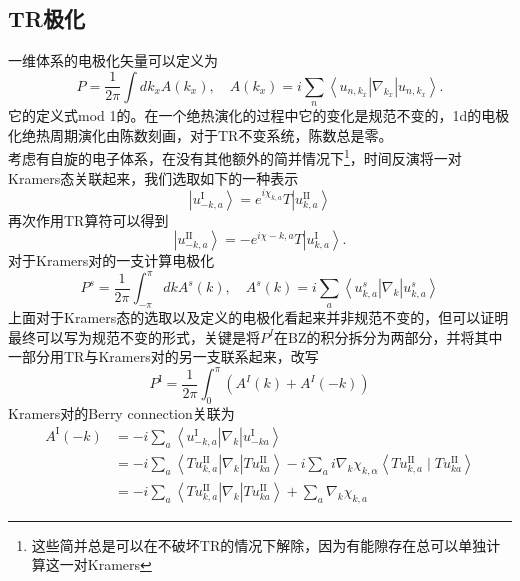 \documentclass[10pt,openany]{book}
\theoremstyle{thmstyle} %
\theoremstyle{defstyle} %
\theoremstyle{prostyle} %
\begin{document}
\subsection{TR极化}
一维体系的电极化矢量可以定义为
\begin{equation}
  P=\frac{1}{2 \pi} \int d k_x A\left(k_x\right), \quad A\left(k_x\right)=i \sum_n\left\langle u_{n, k_x}\right| \nabla_{k_x}\left|u_{n, k_x}\right\rangle .
\end{equation}
它的定义式mod 1的。在一个绝热演化的过程中它的变化是规范不变的，1d的电极化绝热周期演化由陈数刻画，对于TR不变系统，陈数总是零。\\
考虑有自旋的电子体系，在没有其他额外的简并情况下\footnote{这些简并总是可以在不破坏TR的情况下解除，因为有能隙存在总可以单独计算这一对Kramers}，时间反演将一对Kramers态关联起来，我们选取如下的一种表示
\begin{equation*}
  \left|u_{-k, a}^{\mathrm{I}}\right\rangle=e^{i \chi_{k, a}} T\left|u_{k, a}^{\mathrm{II}}\right\rangle
\end{equation*}
再次作用TR算符可以得到
\begin{equation*}
  \left|u_{-k, a}^{\mathrm{II}}\right\rangle=-e^{i \chi-k, a} T\left|u_{k, a}^{\mathrm{I}}\right\rangle .
\end{equation*}
对于Kramers对的一支计算电极化
\begin{equation}
  P^s=\frac{1}{2 \pi} \int_{-\pi}^\pi d k A^s(k), \quad A^s(k)=i \sum_a\left\langle u_{k, a}^s\right| \nabla_k\left|u_{k, a}^s\right\rangle
\end{equation}
上面对于Kramers态的选取以及定义的电极化看起来并非规范不变的，但可以证明最终可以写为规范不变的形式，关键是将$P^I$在BZ的积分拆分为两部分，并将其中一部分用TR与Kramers对的另一支联系起来，改写
\begin{equation*}
  P^{\mathrm{I}}=\frac{1}{2 \pi} \int_0^\pi\left(A^I(k)+A^I(-k)\right)
\end{equation*}
Kramers对的Berry connection关联为
\begin{equation}
  \begin{aligned}
    A^{\mathrm{I}}(-k) & =-i \sum_a\left\langle u_{-k, a}^{\mathrm{I}}\right| \nabla_k\left|u_{-k a}^{\mathrm{I}}\right\rangle \\
    & =-i \sum_a\left\langle T u_{k, a}^{\mathrm{II}}\right| \nabla_k\left|T u_{k a}^{\mathrm{II}}\right\rangle-i \sum_a i \nabla_k \chi_{k, \alpha}\left\langle T u_{k, a}^{\mathrm{II}} \mid T u_{k a}^{\mathrm{II}}\right\rangle \\
    & =-i \sum_a\left\langle T u_{k, a}^{\mathrm{II}}\right| \nabla_k\left|T u_{k a}^{\mathrm{II}}\right\rangle+\sum_a \nabla_k \chi_{k, a}
    \end{aligned}
\end{equation}
\end{document}
